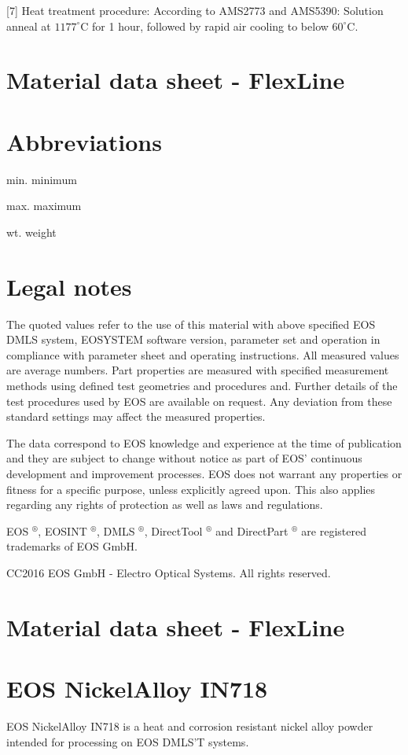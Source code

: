 \documentclass[10pt]{article}
\begin{document}
[7] Heat treatment procedure: According to AMS2773 and AMS5390: Solution anneal at $1177^{\circ} \mathrm{C}$ for 1 hour, followed by rapid air cooling to below $60^{\circ} \mathrm{C}$.

\section*{Material data sheet - FlexLine}
\section*{Abbreviations}
min. minimum

max. maximum

wt. weight

\section*{Legal notes}
The quoted values refer to the use of this material with above specified EOS DMLS system, EOSYSTEM software version, parameter set and operation in compliance with parameter sheet and operating instructions. All measured values are average numbers. Part properties are measured with specified measurement methods using defined test geometries and procedures and. Further details of the test procedures used by EOS are available on request. Any deviation from these standard settings may affect the measured properties.

The data correspond to EOS knowledge and experience at the time of publication and they are subject to change without notice as part of EOS' continuous development and improvement processes. EOS does not warrant any properties or fitness for a specific purpose, unless explicitly agreed upon. This also applies regarding any rights of protection as well as laws and regulations.

EOS $^{\circledR}$, EOSINT $^{\circledR}$, DMLS $^{\circledR}$, DirectTool $^{\circledR}$ and DirectPart ${ }^{\circledR}$ are registered trademarks of EOS GmbH.

CC2016 EOS GmbH - Electro Optical Systems. All rights reserved.

\section*{Material data sheet - FlexLine}
\section*{EOS NickelAlloy IN718}
EOS NickelAlloy IN718 is a heat and corrosion resistant nickel alloy powder intended for processing on EOS DMLS'T systems.
\end{document}
